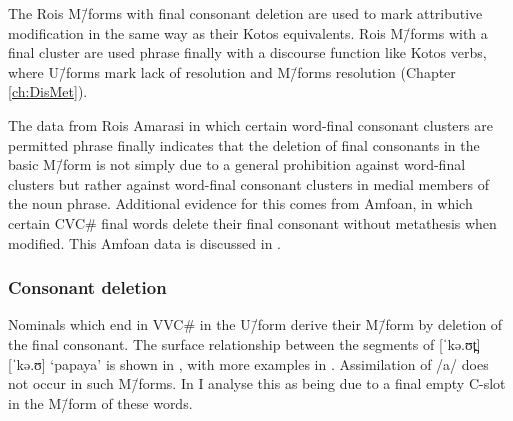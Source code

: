 The Ro{\Q}is M\=/forms with final consonant deletion
are used to mark attributive modification
in the same way as their Kotos equivalents.
Ro{\Q}is M\=/forms with a final cluster are used
phrase finally with a discourse function like
Kotos verbs, where U\=/forms mark lack of resolution and
M\=/forms resolution (Chapter \ref{ch:DisMet}).

The data from Ro{\Q}is Amarasi in which certain
word-final consonant clusters are permitted phrase finally
indicates that the deletion of final consonants in the basic M\=/form
is not simply due to a general prohibition
against word-final clusters but rather against
word-final consonant clusters in medial members of the noun phrase.
Additional evidence for this comes from Amfo{\Q}an,
in which certain CVC{\#} final words delete their
final consonant without metathesis when modified.
This Amfo{\Q}an data is discussed in .

\subsubsection{Consonant deletion}\label{sec:ConDel}
Nominals which end in VVC{\#} in the U\=/form derive their
M\=/form by deletion of the final consonant.
The surface relationship between the segments of
 [ˈkə.ʊt̪] {\ra}  [ˈkə.ʊ] `papaya' is shown in ,
with more examples in .
Assimilation of /a/ does not occur in such M\=/forms.
In  I analyse this as being due to
a final empty C-slot in the M\=/form of these words.

\begin{exe}
	\label{as:kaut/kau} 
	\label{ex:VVC->VV}
	\stl{0.4em}\gw{}
\end{exe}

